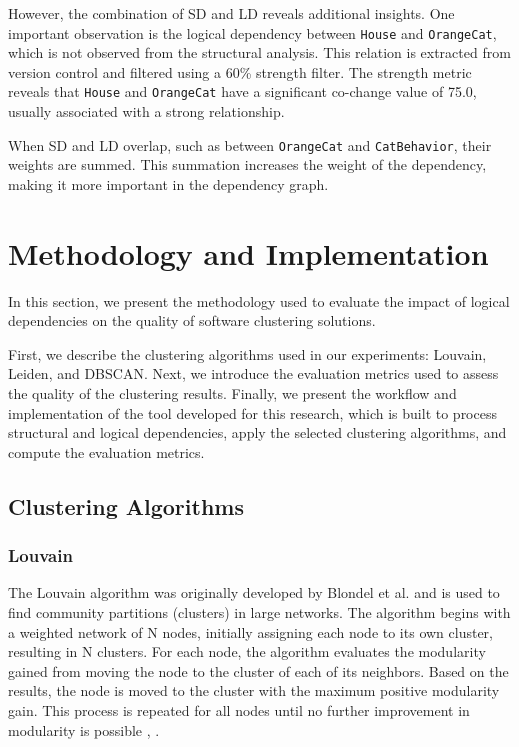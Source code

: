 \documentclass{ieeeaccess}
\begin{document}
However, the combination of SD and LD reveals additional insights. One important observation is the logical dependency between \texttt{House} and \texttt{OrangeCat}, which is not observed from the structural analysis. This relation is extracted from version control and filtered using a 60\% strength filter. The strength metric reveals that \texttt{House} and \texttt{OrangeCat} have a significant co-change value of 75.0, usually associated with a strong relationship.

When SD and LD overlap, such as between \texttt{OrangeCat} and \texttt{CatBehavior}, their weights are summed. This summation increases the weight of the dependency, making it more important in the dependency graph.





\section{Methodology and Implementation}
\label{sec:methodology_implementation}

In this section, we present the methodology used to evaluate the impact of logical dependencies on the quality of software clustering solutions.

First, we describe the clustering algorithms used in our experiments: Louvain, Leiden, and DBSCAN. Next, we introduce the evaluation metrics used to assess the quality of the clustering results. Finally, we present the workflow and implementation of the tool developed for this research, which is built to process structural and logical dependencies, apply the selected clustering algorithms, and compute the evaluation metrics.

\subsection{Clustering Algorithms}
\subsubsection{Louvain}
\label{subsubsec:louvain}

The Louvain algorithm was originally developed by Blondel et al. and is used to find community partitions (clusters) in large networks. The algorithm begins with a weighted network of N nodes, initially assigning each node to its own cluster, resulting in N clusters. For each node, the algorithm evaluates the modularity gained from moving the node to the cluster of each of its neighbors. Based on the results, the node is moved to the cluster with the maximum positive modularity gain. This process is repeated for all nodes until no further improvement in modularity is possible \cite{b8}, \cite{b9}.
\end{document}
